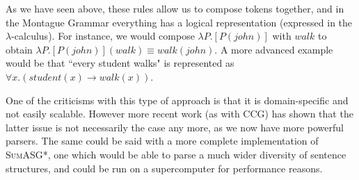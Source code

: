 As we have seen above, these rules allow us to compose tokens together, and in the Montague Grammar everything has a logical representation (expressed in the $\lambda$-calculus). For instance, we would compose $\lambda P.[P(john)]$ with $walk$ to obtain $\lambda P.[P(john)](walk) \equiv walk(john)$. A more advanced example would be that ``every student walks" is represented as $\forall x.(student(x) \to walk(x))$.

\mbox{}

One of the criticisms with this type of approach \cite{clark_combining_nodate} is that it is domain-specific and not easily scalable. However more recent work (as with CCG) has shown that the latter issue is not necessarily the case any more, as we now have more powerful parsers. The same could be said with a more complete implementation of \textsc{SumASG*}, one which would be able to parse a much wider diversity of sentence structures, and could be run on a supercomputer for performance reasons.